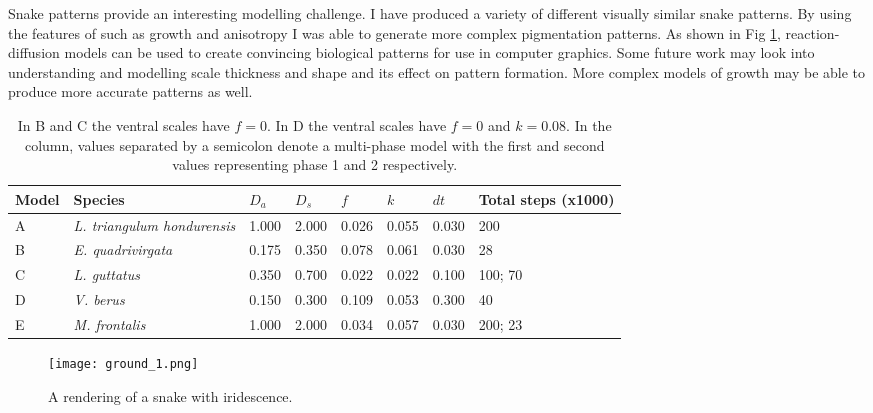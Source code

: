 Snake patterns provide an interesting modelling challenge. I have produced a variety of different visually similar snake patterns. By using the features of \ProgramName{} such as growth and anisotropy I was able to generate more complex pigmentation patterns. As shown in Fig \ref{fig:SnakeRendering}, reaction-diffusion models can be used to create convincing biological patterns for use in computer graphics. Some future work may look into understanding and modelling scale thickness and shape and its effect on pattern formation. More complex models of growth may be able to produce more accurate patterns as well.

\begin{table}[h]
	\centering
	\begin{tabular}{|l|l|l|l|l|l|l|l|}
	\hline
	Model & Species                      &$D_a$ &$D_s$ &$f$    &$k$   &$dt$ &Total steps (x1000)\\ \hline 
	A     &\textit{L. triangulum hondurensis} &1.000 &2.000 &0.026 &0.055 &0.030 &200                \\ \hline
	B     &\textit{E. quadrivirgata}     &0.175 &0.350 &0.078 &0.061 &0.030 &28                 \\ \hline
	C     &\textit{L. guttatus}          &0.350 &0.700 &0.022 &0.022 &0.100 &100; 70            \\ \hline
	D     &\textit{V. berus}             &0.150 &0.300 &0.109 &0.053 &0.300 &40                 \\ \hline
	E     &\textit{M. frontalis}         &1.000 &2.000 &0.034 &0.057 &0.030 &200; 23            \\ \hline
	\end{tabular}
	\caption {In B and C the ventral scales have $f=0$. In D the ventral scales have $f=0$ and $k=0.08$. In the  column, values separated by a semicolon denote a multi-phase model with the first and second values representing phase 1 and 2 respectively.}
	\label{tab:snakeParameters}
\end{table}

\begin{figure}[p]
	\centering
	\texttt{[image: ground\_1.png]}
	\caption{A rendering of a snake with iridescence.}
	\label{fig:SnakeRendering}
\end{figure}